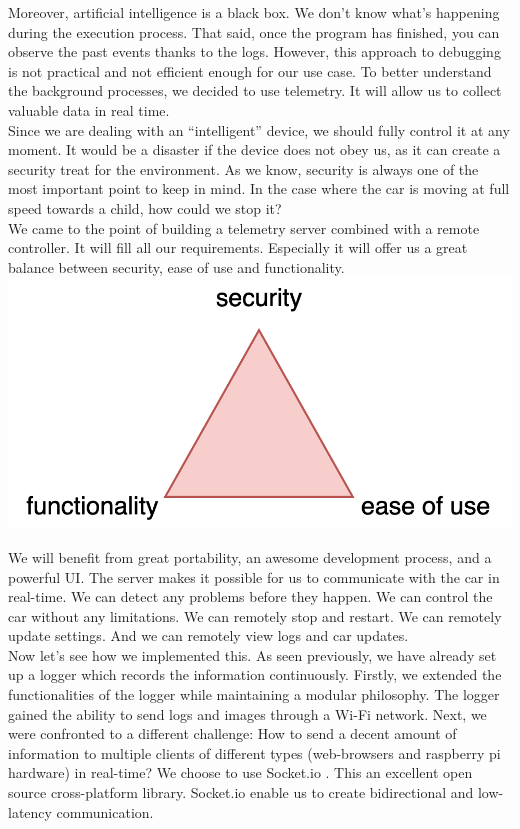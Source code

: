 \documentclass[12pt]{article}
\begin{document}
Moreover, artificial intelligence is a black box. We don't know what's happening during the execution process. That said, once the program has finished, you can observe the past events thanks to the logs. However, this approach to debugging is not practical and not efficient enough for our use case. To better understand the background processes, we decided to use telemetry. It will allow us to collect valuable data in real time.\\ 

Since we are dealing with an “intelligent” device, we should fully control it at any moment. It would be a disaster if the device does not obey us, as it can create a security treat for the environment. As we know, security is always one of the most important point to keep in mind. In the case where the car is moving at full speed towards a child, how could we stop it?\\

We came to the point of building a telemetry server combined with a remote controller. It will fill all our requirements. Especially it will offer us a great balance between security, ease of use and functionality.\\

\includegraphics[width=\textwidth]{../../docs/diagram2.png}

\newpage

We will benefit from great portability, an awesome development process, and a powerful UI. The server makes it possible for us to communicate with the car in real-time. We can detect any problems before they happen. We can control the car without any limitations. We can remotely stop and restart. We can remotely update settings. And we can remotely view logs and car updates.\\ 
Now let's see how we implemented this. As seen previously, we have already set up a logger which records the information continuously. Firstly, we extended the functionalities of the logger while maintaining a modular philosophy. The logger gained the ability to send logs and images through a Wi-Fi network. Next, we were confronted to a different challenge: How to send a decent amount of information to multiple clients of different types (web-browsers and raspberry pi hardware) in real-time?  We choose to use Socket.io . This an excellent open source cross-platform library. Socket.io enable us to create bidirectional and low-latency communication. 
\end{document}
